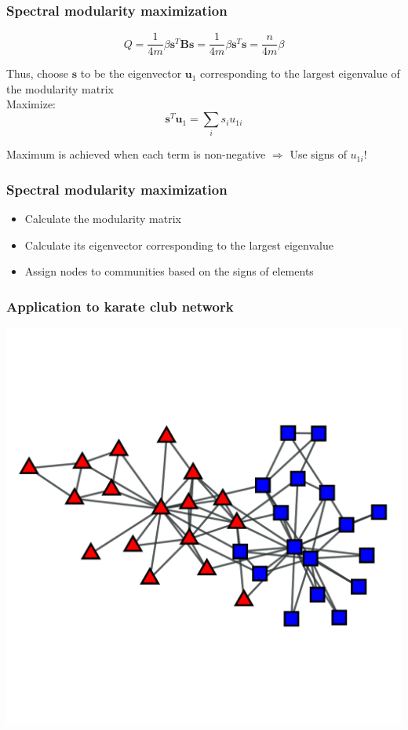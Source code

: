 \documentclass{beamer}
\begin{document}
\begin{frame}
    \frametitle{Spectral modularity maximization}
    \centering
$$Q = \frac{1}{4m}\beta{\mathbf s}^T{\mathbf B}{\mathbf s} = \frac{1}{4m}\beta {\mathbf s}^T{\mathbf s} = \frac{n}{4m}\beta$$

Thus, choose ${\mathbf s}$ to be the eigenvector ${\mathbf u_1}$ corresponding to the largest eigenvalue of the modularity matrix\\

\vspace{1em}
Maximize:
$${\mathbf s}^T{\mathbf u}_1 = \sum\limits_is_iu_{1i}$$

Maximum is achieved when each term is non-negative $\Rightarrow$ Use signs of $u_{1i}$!

\end{frame}
\begin{frame}
    \frametitle{Spectral modularity maximization}
    \centering
    \begin{itemize}
    \setlength\itemsep{1em}
        \item{Calculate the modularity matrix}
        \item{Calculate its eigenvector corresponding to the largest eigenvalue}
        \item{Assign nodes to communities based on the signs of elements}
    \end{itemize}
\end{frame}
\begin{frame}
    \frametitle{Application to karate club network}
    \centering
    \includegraphics[width=0.8\columnwidth]{karate_actual.pdf}
\end{frame}
\end{document}

